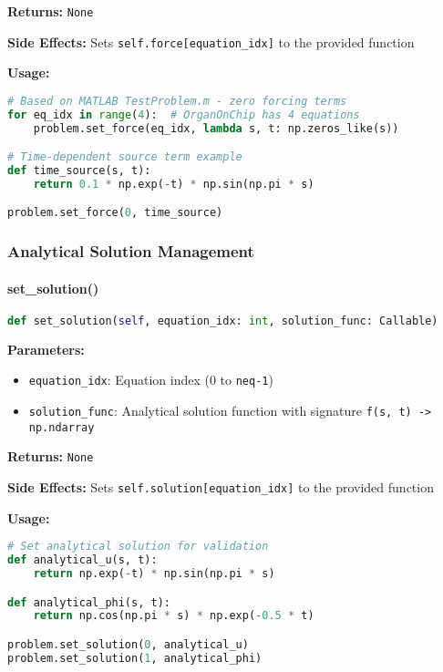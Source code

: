 \textbf{Returns:} \texttt{None}

\textbf{Side Effects:} Sets \texttt{self.force[equation\_idx]} to the provided function

\textbf{Usage:}
\begin{lstlisting}[language=Python, caption=Force Function Usage]
# Based on MATLAB TestProblem.m - zero forcing terms
for eq_idx in range(4):  # OrganOnChip has 4 equations
    problem.set_force(eq_idx, lambda s, t: np.zeros_like(s))

# Time-dependent source term example
def time_source(s, t):
    return 0.1 * np.exp(-t) * np.sin(np.pi * s)

problem.set_force(0, time_source)
\end{lstlisting}

\subsubsection{Analytical Solution Management}

\paragraph{set\_solution()}\leavevmode
\begin{lstlisting}[language=Python, caption=Set Solution Method]
def set_solution(self, equation_idx: int, solution_func: Callable)
\end{lstlisting}

\textbf{Parameters:}
\begin{itemize}
    \item \texttt{equation\_idx}: Equation index (0 to \texttt{neq-1})
    \item \texttt{solution\_func}: Analytical solution function with signature \texttt{f(s, t) -> np.ndarray}
\end{itemize}

\textbf{Returns:} \texttt{None}

\textbf{Side Effects:} Sets \texttt{self.solution[equation\_idx]} to the provided function

\textbf{Usage:}
\begin{lstlisting}[language=Python, caption=Analytical Solution Usage]
# Set analytical solution for validation
def analytical_u(s, t):
    return np.exp(-t) * np.sin(np.pi * s)

def analytical_phi(s, t):
    return np.cos(np.pi * s) * np.exp(-0.5 * t)

problem.set_solution(0, analytical_u)
problem.set_solution(1, analytical_phi)
\end{lstlisting}

